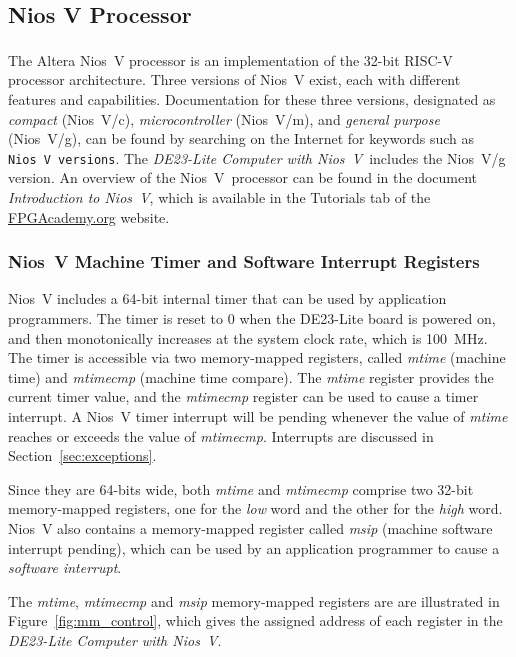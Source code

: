 \documentclass[11pt, twoside, pdftex]{article}
\newcommand{\DEBoard}{DE23-Lite}
\newcommand{\systemNameFull}{DE23-Lite Computer with Nios~V}
\newcommand{\processor}{Nios~V}
\begin{document}
\subsection{Nios\textsuperscript{\textregistered} V Processor}
\label{sec:niosV}
The Altera Nios\textsuperscript{\textregistered}~V processor 
is an implementation of the 32-bit RISC-V processor architecture. Three versions of 
Nios~V exist, each with different features and capabilities.  Documentation for these 
three versions, designated as {\it compact} (Nios~V/c), {\it microcontroller} (Nios~V/m),
and {\it general purpose} (Nios~V/g), can be found by searching on the Internet for keywords 
such as \texttt{Nios~V versions}. The {\it \systemNameFull}~includes 
the Nios~V/g version. An overview of the \processor~processor can be found in the 
document {\it Introduction to \processor}, which is available in the 
Tutorials tab of the 
{\small \href{https://www.fpgacademy.org/tutorials.html} {FPGAcademy.org}} website.

\subsubsection{Nios~V Machine Timer and Software Interrupt Registers}
\label{sec:mtimer}
Nios~V includes a 64-bit internal timer that can be used by application programmers. 
The timer is reset to 0 when the {\DEBoard} board is powered on, and then monotonically
increases at the system clock rate, which is 100~MHz. The timer is accessible via two 
memory-mapped registers, 
called {\it mtime} (machine time) and {\it mtimecmp} (machine time compare). The 
{\it mtime} register provides the current timer value, and the {\it mtimecmp} register 
can be used to cause a timer interrupt. A Nios~V timer interrupt will be pending whenever 
the value of {\it mtime} reaches or exceeds the value of {\it mtimecmp}. Interrupts are 
discussed in Section~\ref{sec:exceptions}.

Since they are 64-bits wide, both {\it mtime} and {\it mtimecmp} comprise two 32-bit 
memory-mapped registers, one for the {\it low} word and the other for the {\it high} word. 
Nios~V also contains a memory-mapped register called {\it msip} (machine software interrupt
pending), which can be used by an application programmer to cause a {\it software interrupt}.

The {\it mtime}, {\it mtimecmp} and {\it msip} memory-mapped registers are 
are illustrated in Figure~\ref{fig:mm_control}, which gives the assigned address of each 
register in the {\it \systemNameFull}.
\end{document}
